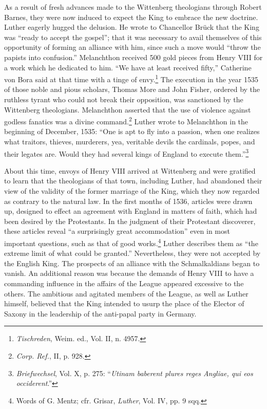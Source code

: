 As a result of fresh advances made to the Wittenberg theologians
through Robert Barnes, they were now induced to expect the King
to embrace the new doctrine. Luther eagerly hugged the delusion. He
wrote to Chancellor Brück that the King was “ready to accept the
gospel”; that it was necessary to avail themselves of this opportunity
of forming an alliance with him, since such a move would “throw
the papists into confusion.” Melanchthon received 500 gold pieces
from Henry VIII for a work which he dedicated to him. “We have
at least received fifty,” Catherine von Bora said at that time with a
tinge of envy.\footnote{\textit{Tischreden}, Weim. ed., Vol. II, n. 4957.}
 The execution in the year 1535 of those noble and
pious scholars, Thomas More and John Fisher, ordered by the ruthless tyrant
who could not break their opposition, was sanctioned
by the Wittenberg theologians. Melanchthon asserted that the use
of violence against godless fanatics was a divine command.\footnote{\textit{Corp. Ref.}, II, p. 928.}
Luther wrote to Melanchthon in the beginning of December, 1535: “One
is apt to fly into a passion, when one realizes what traitors, thieves,
murderers, yea, veritable devils the cardinals, popes, and their legates
are. Would they had several kings of England to execute them.”\footnote{\textit{Briefwechsel}, Vol. X, p. 275: “\textit{Utinam baberent plures reges Angliae, qui eos occiderent}.”}

About this time, envoys of Henry VIII arrived at Wittenberg
and were gratified to learn that the theologians of that town, including
Luther, had abandoned their view of the validity of the
former marriage of the King, which they now regarded as contrary
to the natural law. In the first months of 1536, articles were drawn
up, designed to effect an agreement with England in matters of
faith, which had been desired by the Protestants. In the judgment of
their Protestant discoverer, these articles reveal “a surprisingly great
accommodation” even in most important questions, such as that of
good works.\footnote{Words of G. Mentz; cfr. Grisar, \textit{Luther}, Vol. IV, pp. 9 sqq.}
 Luther describes them as “the extreme limit of what
could be granted.” Nevertheless, they were not accepted by the
English King. The prospects of an alliance with the Schmalkaldians
began to vanish. An additional reason was because the demands of
Henry VIII to have a commanding influence in the affairs of the
League appeared excessive to the others. The ambitious and agitated
members of the League, as well as Luther himself, believed that the
King intended to usurp the place of the Elector of Saxony in the
leadership of the anti-papal party in Germany.

